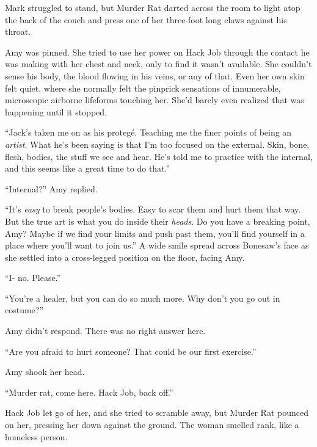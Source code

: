 Mark struggled to stand, but Murder Rat darted across the room to light atop the back of the couch and press one of her three-foot long claws against his throat.



Amy was pinned.  She tried to use her power on Hack Job through the contact he was making with her chest and neck, only to find it wasn't available.  She couldn't sense his body, the blood flowing in his veins, or any of that.  Even her own skin felt quiet, where she normally felt the pinprick sensations of innumerable, microscopic airborne lifeforms touching her.  She'd barely even realized that was happening until it stopped.



``Jack's taken me on as his proteg\'{e}.  Teaching me the finer points of being an \emph{artist}.  What he's been saying is that I'm too focused on the external.  Skin, bone, flesh, bodies, the stuff we see and hear.  He's told me to practice with the internal, and this seems like a great time to do that.''



``Internal?'' Amy replied.



``It's \emph{easy} to break people's bodies.  Easy to scar them and hurt them that way.  But the true art is what you do inside their \emph{heads}.  Do you have a breaking point, Amy?  Maybe if we find your limits and push past them, you'll find yourself in a place where you'll want to join us.''  A wide smile spread across Bonesaw's face as she settled into a cross-legged position on the floor, facing Amy.



``I- no.  Please.''



``You're a healer, but you can do so much more.  Why don't you go out in costume?''



Amy didn't respond.  There was no right answer here.



``Are you afraid to hurt someone?  That could be our first exercise.''



Amy shook her head.



``Murder rat, come here.  Hack Job, back off.''



Hack Job let go of her, and she tried to scramble away, but Murder Rat pounced on her, pressing her down against the ground.  The woman smelled rank, like a homeless person.



